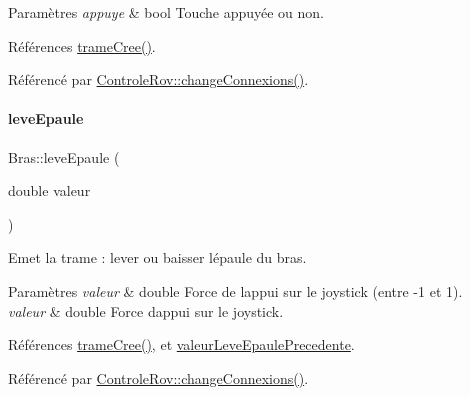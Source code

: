 \begin{DoxyParams}{Paramètres}
{\em appuye} & bool Touche appuyée ou non. \\
\hline
\end{DoxyParams}


Références \hyperlink{class_bras_ab442bf8d3e389c051b26b4b0741e7924}{trame\+Cree()}.



Référencé par \hyperlink{class_controle_rov_a400d5766b9acabb45c1af5f8b22bbe47}{Controle\+Rov\+::change\+Connexions()}.


\mbox{\label{class_bras_ac8f658db87d03bfbba6faa535326cc3a}} 
\paragraph{\texorpdfstring{leve\+Epaule}{leveEpaule}}
{\footnotesize\ttfamily Bras\+::leve\+Epaule (\begin{DoxyParamCaption}\item[{double}]{valeur }\end{DoxyParamCaption})\hspace{0.3cm}{\ttfamily [slot]}}

Emet la trame \+: lever ou baisser l\textquotesingle{}épaule du bras.


\begin{DoxyParams}{Paramètres}
{\em valeur} & double Force de l\textquotesingle{}appui sur le joystick (entre -\/1 et 1).\\
\hline
{\em valeur} & double Force d\textquotesingle{}appui sur le joystick. \\
\hline
\end{DoxyParams}


Références \hyperlink{class_bras_ab442bf8d3e389c051b26b4b0741e7924}{trame\+Cree()}, et \hyperlink{class_bras_ab9045906376dd797febdcb5956b155c1}{valeur\+Leve\+Epaule\+Precedente}.



Référencé par \hyperlink{class_controle_rov_a400d5766b9acabb45c1af5f8b22bbe47}{Controle\+Rov\+::change\+Connexions()}.


